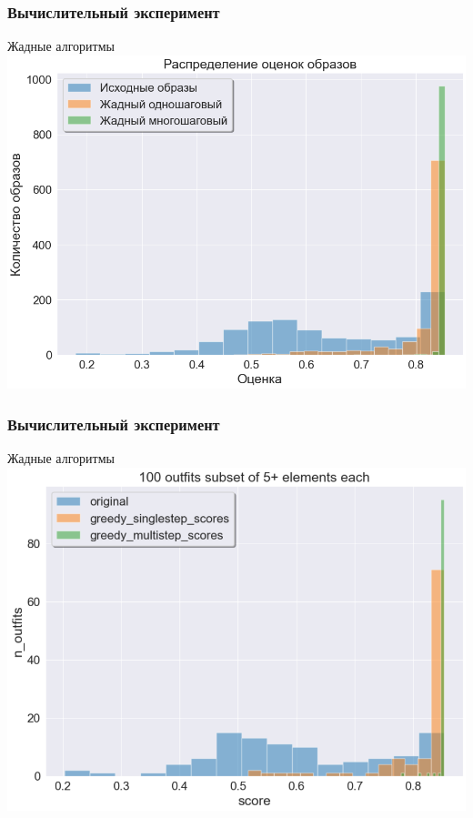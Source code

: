 \documentclass[10pt]{beamer}
\begin{document}
\begin{frame}
	\frametitle{Вычислительный эксперимент}
	\begin{block}{Жадные алгоритмы}
		\includegraphics[scale = 0.5]{../figures/greedy_at_least_5_subset1000.png}
	\end{block}
\end{frame}


\begin{frame}
	\frametitle{Вычислительный эксперимент}
	\begin{block}{Жадные алгоритмы}
		\includegraphics[scale = 0.52]{../figures/greedy_at_least_5_subset100.png}
	\end{block}
\end{frame}
\end{document}
